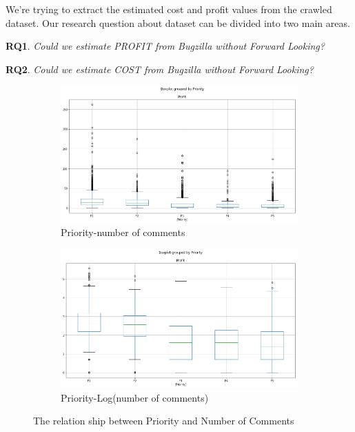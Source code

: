 We're trying to extract the estimated cost and profit values from the crawled dataset. Our research question about dataset can be divided into two main areas.

\textbf{RQ1}. \textit{Could we estimate PROFIT from Bugzilla without Forward Looking?}

\textbf{RQ2}. \textit{Could we estimate COST from Bugzilla without Forward Looking?}

\begin{figure}
\centering
  \begin{subfigure}[b]{0.45\linewidth}
    \includegraphics[width=\linewidth]{images/boxplotraw.png}
    \caption{Priority-number of comments}
  \end{subfigure}
  \begin{subfigure}[b]{0.45\linewidth}
    \includegraphics[width=\linewidth]{images/boxplot.png}
    \caption{Priority-Log(number of comments)}
  \end{subfigure}
  \caption{The relation ship between Priority and Number of Comments}
  \label{fig:priority_comments}
\end{figure}
